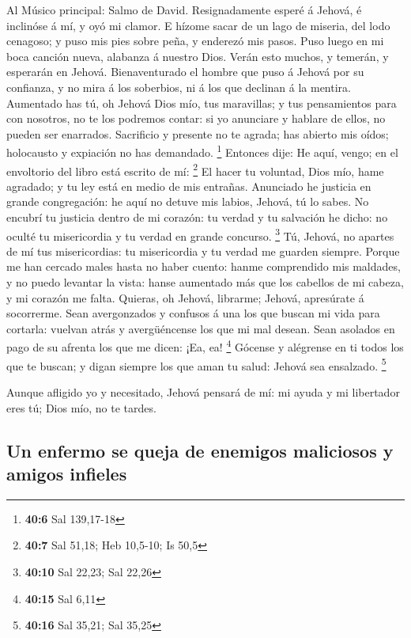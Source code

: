  Al Músico principal: Salmo de David. Resignadamente esperé
á Jehová, é inclinóse á mí, y oyó mi clamor.  E hízome sacar
de un lago de miseria, del lodo cenagoso; y puso mis pies sobre peña, y
enderezó mis pasos.  Puso luego en mi boca canción nueva,
alabanza á nuestro Dios. Verán esto muchos, y temerán, y esperarán en
Jehová.  Bienaventurado el hombre que puso á Jehová por su
confianza, y no mira á los soberbios, ni á los que declinan á la
mentira.  Aumentado has tú, oh Jehová Dios mío, tus
maravillas; y tus pensamientos para con nosotros, no te los podremos
contar: si yo anunciare y hablare de ellos, no pueden ser enarrados.
 Sacrificio y presente no te agrada; has abierto mis oídos;
holocausto y expiación no has demandado. \footnote{\textbf{40:6} Sal
  139,17-18}  Entonces dije: He aquí, vengo; en el
envoltorio del libro está escrito de mí: \footnote{\textbf{40:7} Sal
  51,18; Heb 10,5-10; Is 50,5}  El hacer tu voluntad, Dios
mío, hame agradado; y tu ley está en medio de mis entrañas. 
Anunciado he justicia en grande congregación: he aquí no detuve mis
labios, Jehová, tú lo sabes.  No encubrí tu justicia dentro
de mi corazón: tu verdad y tu salvación he dicho: no oculté tu
misericordia y tu verdad en grande concurso. \footnote{\textbf{40:10}
  Sal 22,23; Sal 22,26}  Tú, Jehová, no apartes de mí tus
misericordias: tu misericordia y tu verdad me guarden siempre.
 Porque me han cercado males hasta no haber cuento: hanme
comprendido mis maldades, y no puedo levantar la vista: hanse aumentado
más que los cabellos de mi cabeza, y mi corazón me falta. 
Quieras, oh Jehová, librarme; Jehová, apresúrate á socorrerme.
 Sean avergonzados y confusos á una los que buscan mi vida
para cortarla: vuelvan atrás y avergüéncense los que mi mal desean.
 Sean asolados en pago de su afrenta los que me dicen: ¡Ea,
ea! \footnote{\textbf{40:15} Sal 6,11}  Gócense y alégrense
en ti todos los que te buscan; y digan siempre los que aman tu salud:
Jehová sea ensalzado. \footnote{\textbf{40:16} Sal 35,21; Sal 35,25}

 Aunque afligido yo y necesitado, Jehová pensará de mí: mi
ayuda y mi libertador eres tú; Dios mío, no te tardes.

\hypertarget{un-enfermo-se-queja-de-enemigos-maliciosos-y-amigos-infieles}{%
\subsection{Un enfermo se queja de enemigos maliciosos y amigos
infieles}\label{un-enfermo-se-queja-de-enemigos-maliciosos-y-amigos-infieles}}

